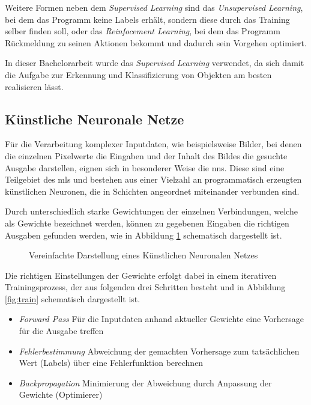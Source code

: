Weitere Formen neben dem \textit{Supervised Learning} sind das 
\textit{Unsupervised Learning}, bei dem das Programm keine Labels 
erhält, sondern diese durch das Training selber finden 
soll, oder das \textit{Reinfocement Learning}, bei dem das Programm 
Rückmeldung zu seinen Aktionen bekommt und dadurch sein Vorgehen
optimiert.

In dieser Bachelorarbeit wurde das \textit{Supervised Learning}
verwendet, da sich damit die Aufgabe zur Erkennung und Klassifizierung 
von Objekten am besten realisieren lässt.


\subsection{Künstliche Neuronale Netze} \label{subsec:nn}

Für die Verarbeitung komplexer Inputdaten,
wie beispielsweise Bilder, bei denen 
die einzelnen Pixelwerte die Eingaben und der Inhalt des Bildes die 
gesuchte Ausgabe darstellen, eignen sich in besonderer Weise 
die \Glspl{nn}.
Diese sind eine Teilgebiet des \Glspl{ml} und bestehen
aus einer Vielzahl an programmatisch erzeugten künstlichen Neuronen,
die in Schichten angeordnet miteinander verbunden sind.

Durch unterschiedlich starke Gewichtungen der einzelnen
Verbindungen, welche als Gewichte bezeichnet werden, 
können zu gegebenen Eingaben die richtigen Ausgaben gefunden werden,
wie in Abbildung \ref{fig:nn} schematisch dargestellt ist.
\vspace{1cm}

\begin{figure}[H]
    \centering
    \def\svgwidth{0.85\columnwidth}
    
    \caption{Vereinfachte Darstellung eines Künstlichen 
    Neuronalen Netzes}
    \label{fig:nn}
\end{figure}
\vspace{1cm}

Die richtigen Einstellungen der Gewichte erfolgt dabei
in einem iterativen Trainingsprozess, der aus folgenden 
drei Schritten besteht und in Abbildung \ref{fig:train}
schematisch dargestellt ist. 

\begin{itemize}
    \item \textit{Forward Pass} Für die Inputdaten anhand
            aktueller Gewichte eine Vorhersage für die Ausgabe treffen
    \item \textit{Fehlerbestimmung} Abweichung der gemachten Vorhersage
             zum tatsächlichen Wert (Labels) über eine Fehlerfunktion berechnen
    \item \textit{Backpropagation} Minimierung der
            Abweichung durch Anpassung der Gewichte (Optimierer)
\end{itemize}

